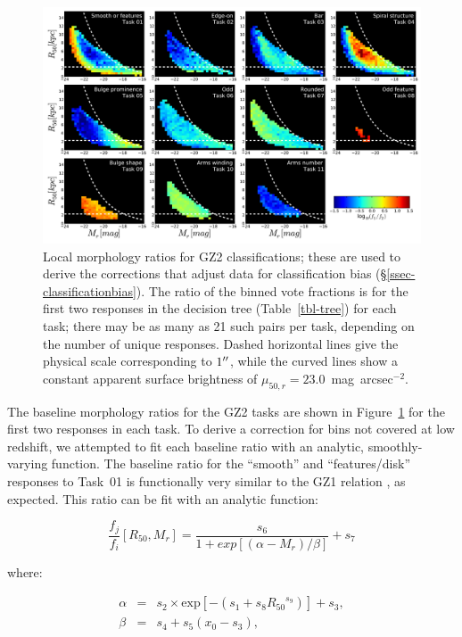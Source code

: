 \documentclass[useAMS,usenatbib]{mn2e}
\begin{document}
\begin{figure}
\includegraphics[angle=0,width=7.0in]{figures/gz2_baselines.pdf}
\caption{Local morphology ratios for GZ2 classifications; these are used to derive the corrections that adjust data for classification bias (\S\ref{ssec-classificationbias}). The ratio of the binned vote fractions is for the first two responses in the decision tree (Table~\ref{tbl-tree}) for each task; there may be as many as 21 such pairs per task, depending on the number of unique responses. Dashed horizontal lines give the physical scale corresponding to $1\hbox{$^{\prime\prime}$}$, while the curved lines show a constant apparent surface brightness of $\mu_{50,r}=23.0$~mag~arcsec$^{-2}$.
\label{fig-baselines}}
\end{figure}

The baseline morphology ratios for the GZ2 tasks are shown in Figure~\ref{fig-baselines} for the first two responses in each task. To derive a correction for bins not covered at low redshift, we attempted to fit each baseline ratio with an analytic, smoothly-varying function. The baseline ratio for the ``smooth'' and ``features/disk'' responses to Task~01 is functionally very similar to the GZ1 relation \citep[Figure~A5 in][]{bam09}, as expected. This ratio can be fit with an analytic function: 

\begin{equation}
\frac{f_j}{f_i}[R_{50},M_r] = \frac{s_6}{1 + exp[(\alpha - M_r)/\beta]} + s_7
\label{eqn-sb}
\end{equation}

\noindent where:

\begin{eqnarray}
\alpha &=& s_2\times\text{exp}[{-\left(s_1 + s_8{R_{50}}^{s_9}\right)}] + s_3, \\
\beta  &=& s_4 + s_5(x_0 - s_3),
\end{eqnarray}
\end{document}
